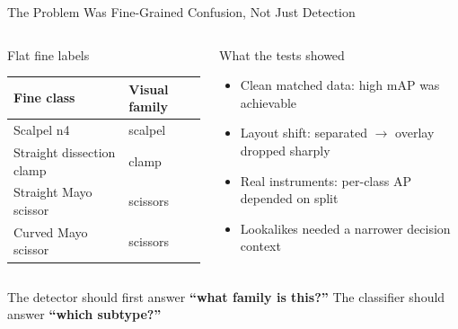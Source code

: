 \documentclass[10pt,aspectratio=169]{beamer}
\begin{document}
\begin{frame}{The Problem Was Fine-Grained Confusion, Not Just Detection}
  \begin{columns}[T]
    \begin{block}{Flat fine labels}
      \small
      \begin{tabular}{ll}
        \toprule
        Fine class & Visual family \\
        \midrule
        Scalpel n4 & scalpel \\
        Straight dissection clamp & clamp \\
        Straight Mayo scissor & scissors \\
        Curved Mayo scissor & scissors \\
        \bottomrule
      \end{tabular}
    \end{block}
    \begin{alertblock}{What the tests showed}
      \small
      \begin{itemize}
        \item Clean matched data: high mAP was achievable
        \item Layout shift: separated $\rightarrow$ overlay dropped sharply
        \item Real instruments: per-class AP depended on split
        \item Lookalikes needed a narrower decision context
      \end{itemize}
    \end{alertblock}
  \end{columns}
  \vspace{0.25cm}
  \begin{exampleblock}{}
    \centering
    The detector should first answer \textbf{``what family is this?''}\quad
    The classifier should answer \textbf{``which subtype?''}
  \end{exampleblock}
\end{frame}
\end{document}
